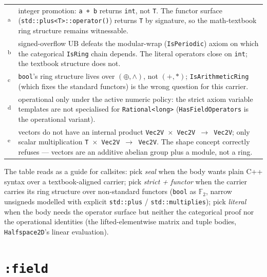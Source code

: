 \documentclass[11pt, a4paper]{report}
\begin{document}
\begin{table}[ht]
\vspace{0.5em}
\begin{tabular}{@{}l p{}@{}}
\textsuperscript{a} & integer promotion: \texttt{a + b} returns \texttt{int}, not \texttt{T}. The functor surface (\texttt{std::plus<T>::operator()}) returns \texttt{T} by signature, so the math-textbook ring structure remains witnessable. \\
\textsuperscript{b} & signed-overflow UB defeats the modular-wrap (\texttt{IsPeriodic}) axiom on which the categorical \texttt{IsRing} chain depends. The literal operators close on \texttt{int}; the textbook structure does not. \\
\textsuperscript{c} & \texttt{bool}'s ring structure lives over $(\oplus, \wedge)$, not $(+, *)$; \texttt{IsArithmeticRing} (which fixes the standard functors) is the wrong question for this carrier. \\
\textsuperscript{d} & operational only under the active numeric policy: the strict axiom variable templates are not specialised for \texttt{Rational<long>} (\texttt{HasFieldOperators} is the operational variant). \\
\textsuperscript{e} & vectors do not have an internal product \texttt{Vec2V $\times$ Vec2V $\to$ Vec2V}; only scalar multiplication \texttt{T $\times$ Vec2V $\to$ Vec2V}. The shape concept correctly refuses --- vectors are an additive abelian group plus a module, not a ring. \\
\end{tabular}
\end{table}

The table reads as a guide for callsites: pick \emph{seal} when the body wants plain C++ syntax over a textbook-aligned carrier; pick \emph{strict + functor} when the carrier carries its ring structure over non-standard functors (\texttt{bool} as $\mathbb{F}_2$, narrow unsigneds modelled with explicit \texttt{std::plus} / \texttt{std::multiplies}); pick \emph{literal} when the body needs the operator surface but neither the categorical proof nor the operational identities (the lifted-elementwise matrix and tuple bodies, \texttt{Halfspace2D}'s linear evaluation).

\section{\texttt{:field}}
\label{sec:algebra-field}
\end{document}

